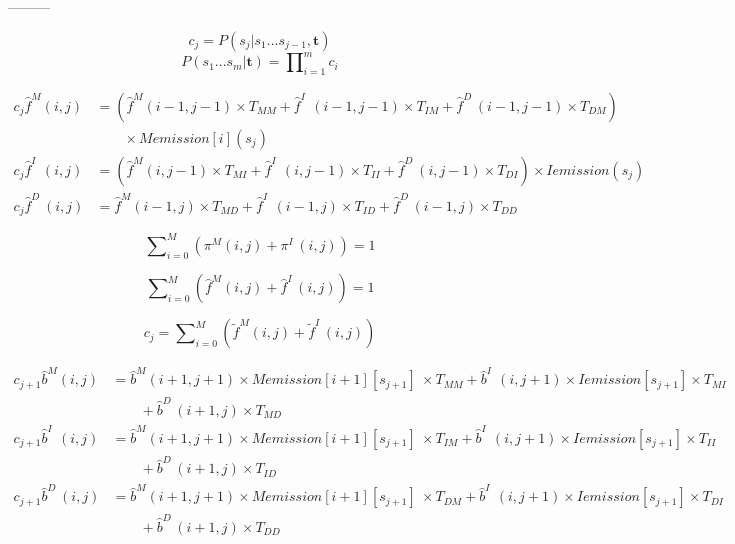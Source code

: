 \documentclass[10pt]{article}
\begin{document}
    ---------

    \begin{equation}
      c_j = P(s_j | s_1...s_{j-1},\mathbf{t})
    \end{equation}
    \begin{equation}
      P(s_1...s_m | \mathbf{t}) = \prod\nolimits_{i=1}^{m} c_i
    \end{equation}

    \begin{align}
      c_j \widehat{f}^{M}(i, j) &= (\widehat{f}^{M}(i-1, j-1) \times T_{MM}  + \widehat{f}^{I\;\;}(i-1, j-1) \times T_{IM} + \widehat{f}^{D\;}(i-1, j-1) \times T_{DM}) \\ 
        &\qquad\times Memission[i](s_j) \nonumber \\
      c_j \widehat{f}^{I\;\;}(i, j) &= (\widehat{f}^{M}(i, j-1) \times T_{MI}  + \widehat{f}^{I\;\;}(i, j-1) \times T_{II} + \widehat{f}^{D\;}(i, j-1) \times T_{DI}) \times Iemission(s_j) \\
      c_j \widehat{f}^{D\;}(i, j) &= \widehat{f}^{M}(i-1, j) \times T_{MD}  + \widehat{f}^{I\;\;}(i-1, j) \times T_{ID} + \widehat{f}^{D\;}(i-1, j) \times T_{DD}
    \end{align}

    \begin{equation}
      \sum\nolimits_{i=0}^{M} \left( \pi^{M}(i, j) + \pi^{I\;}(i, j) \right) = 1
    \end{equation}

    \begin{equation}
      \sum\nolimits_{i=0}^{M} \left( \widehat{f}^{M}(i, j) + \widehat{f}^{I\;}(i, j) \right) = 1
    \end{equation}

    \begin{equation}
      c_j = \sum\nolimits_{i=0}^{M} \left( \widetilde{f}^{M}(i, j) + \widetilde{f}^{I\;}(i, j) \right)
    \end{equation}

    \begin{equation}
    \begin{aligned}
      c_{j+1} \widehat{b}^{M}(i, j) &= \widehat{b}^M(i+1, j+1) \times Memission[i+1][s_{j+1}] \
        \times T_{MM} + \widehat{b}^{I\;\;}(i, j+1) \times Iemission[s_{j+1}] \times T_{MI} \\
                 &\qquad+ \widehat{b}^{D\;}(i+1, j) \times T_{MD} \\
      c_{j+1} \widehat{b}^{I\;\;}(i, j) &= \widehat{b}^M(i+1, j+1) \times Memission[i+1][s_{j+1}] \
        \times T_{IM} + \widehat{b}^{I\;\;}(i, j+1) \times Iemission[s_{j+1}] \times T_{II} \\
                  &\qquad+ \widehat{b}^{D\;}(i+1, j) \times T_{ID} \\
      c_{j+1} \widehat{b}^{D\;}(i, j) &= \widehat{b}^M(i+1, j+1) \times Memission[i+1][s_{j+1}] \
        \times T_{DM} + \widehat{b}^{I\;\;}(i, j+1) \times Iemission[s_{j+1}] \times T_{DI} \\
                  &\qquad+ \widehat{b}^{D\;}(i+1, j) \times T_{DD}
    \end{aligned} 
    \end{equation}
\end{document}
